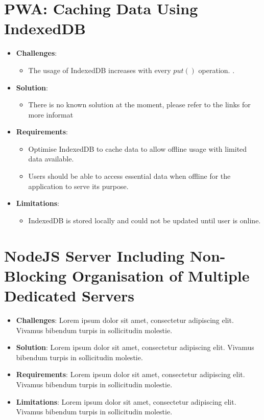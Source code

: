 \documentclass[11pt, a4paper]{article}
\begin{document}
\section{PWA: Caching Data Using IndexedDB}
\begin{itemize}
  \item \textbf{Challenges}:
  \begin{itemize}
    \item The usage of IndexedDB increases with every $put()$ operation. \cite{leveldb_593, leveldb_603}. 
    
  \end{itemize}
  \item \textbf{Solution}:
  \begin{itemize}
    \item There is no known solution at the moment, please refer to the links for more informat
  \end{itemize}
  \item \textbf{Requirements}:
  \begin{itemize}
    \item Optimise IndexedDB to cache data to allow offline usage with limited data available.
    \item Users should be able to access essential data when offline for the application to serve its 
    purpose.
  \end{itemize}
  \item \textbf{Limitations}: 
  \begin{itemize}
    \item IndexedDB is stored locally and could not be updated until user is online.
  \end{itemize}
\end{itemize}

\section{NodeJS Server Including Non-Blocking Organisation of Multiple Dedicated Servers}
\begin{itemize}
  \item \textbf{Challenges}: Lorem ipsum dolor sit amet, consectetur adipiscing elit. Vivamus
  bibendum turpis in sollicitudin molestie.
  \item \textbf{Solution}: Lorem ipsum dolor sit amet, consectetur adipiscing elit. Vivamus bibendum
  turpis in sollicitudin molestie.
  \item \textbf{Requirements}: Lorem ipsum dolor sit amet, consectetur adipiscing elit. Vivamus
  bibendum turpis in sollicitudin molestie.
  \item \textbf{Limitations}: Lorem ipsum dolor sit amet, consectetur adipiscing elit. Vivamus
  bibendum turpis in sollicitudin molestie.
\end{itemize}
\end{document}
